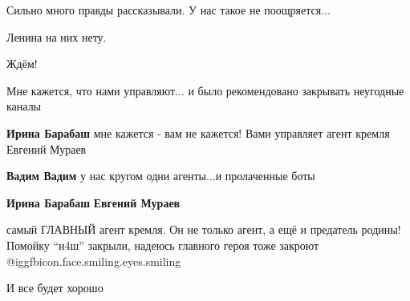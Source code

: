 \begin{itemize}
Сильно много правды рассказывали. У нас такое не поощряется...

Ленина на них нету.

Ждём!

Мне кажется, что нами управляют... и было рекомендовано закрывать неугодные каналы

\begin{itemize} %
\textbf{Ирина Барабаш} мне кажется - вам не кажется! Вами управляет агент кремля Евгений Мураев

\textbf{Вадим Вадим} у нас кругом одни агенты...и пролаченные боты

\textbf{Ирина Барабаш} \textbf{Евгений Мураев} 

самый ГЛАВНЫЙ агент кремля. Он не только агент, а ещё и предатель родины!
Помойку \enquote{н4ш} закрыли, надеюсь главного героя тоже закроют
@igg{fbicon.face.smiling.eyes.smiling}

И все будет хорошо

\end{itemize} %


\end{itemize} %
